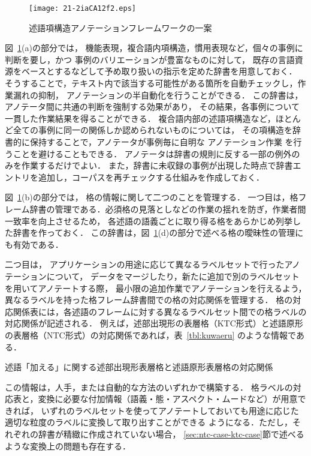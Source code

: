 \documentclass[japanese]{jnlp_1.4}
\begin{document}
\begin{figure}[t]
\begin{center}
\texttt{[image: 21-2iaCA12f2.eps]}
\end{center}
\caption{述語項構造アノテーションフレームワークの一案}
\label{fig:framework}
\end{figure}

図~\ref{fig:framework}(a)の部分では，
機能表現，複合語内項構造，慣用表現など，個々の事例に判断を要し，かつ
事例のバリエーションが豊富なものに対して，
既存の言語資源をベースとするなどして予め取り扱いの指示を定めた辞書を用意しておく．
そうすることで，テキスト内で該当する可能性がある箇所を自動チェックし，作業漏れの抑制，
アノテーションの半自動化を行うことができる．
この辞書は，アノテータ間に共通の判断を強制する効果があり，
その結果，各事例について一貫した作業結果を得ることができる．
複合語内部の述語項構造など，ほとんど全ての事例に同一の関係しか認められないものについては，
その項構造を辞書的に保持することで，アノテータが事例毎に自明な
アノテーション作業
を行うことを避けることもできる．
アノテータは辞書の規則に反する一部の例外のみを作業するだけでよい．
また，辞書に未収録の事例が出現した時点で辞書エントリを追加し，コーパスを再チェックする仕組みを作成しておく．

図~\ref{fig:framework}(b)の部分では，
格の情報に関して二つのことを管理する．
一つ目は，格フレーム辞書の管理である．必須格の見落としなどの作業の揺れを防ぎ，作業者間一致率を向上させるため，
各述語の語義ごとに取り得る格をあらかじめ列挙した辞書を作っておく．
この辞書は，図~\ref{fig:framework}(d)の部分で述べる格の曖昧性の管理にも有効である．

二つ目は，
アプリケーションの用途に応じて異なるラベルセットで行ったアノテーションについて，
データをマージしたり，新たに追加で別のラベルセットを用いてアノテートする際，
最小限の追加作業でアノテーションを行えるよう，
異なるラベルを持った格フレーム辞書間での格の対応関係を管理する．
格の対応関係表には，各述語のフレームに対する異なるラベルセット間での格ラベルの対応関係が記述される．
例えば，述部出現形の表層格（KTC形式）と述語原形の表層格（NTC形式）の対応関係であれば，表~\ref{tbl:kuwaeru}
のような情報である．

\begin{table}[b]
\caption{述語「加える」に関する述部出現形表層格と述語原形表層格の対応関係}
\label{tbl:kuwaeru}

\end{table}

この情報は，人手，または自動的な方法のいずれかで構築する．
格ラベルの対応表と，変換に必要な付加情報（語義・態・アスペクト・ムードなど）が用意できれば，
いずれのラベルセットを使ってアノテートしておいても用途に応じた適切な粒度のラベルに変換して取り出すことができる
ようになる．ただし，それぞれの辞書が精緻に作成されていない場合，
\ref{sec:ntc-case-ktc-case}節で述べるような変換上の問題も存在する．
\end{document}
